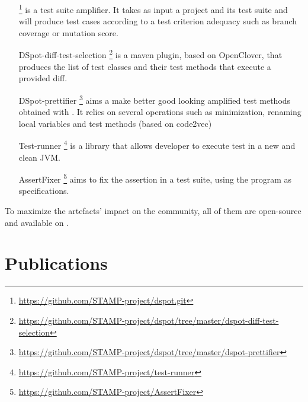\begin{itemize}
	\item[\dspot]\footnote{\url{https://github.com/STAMP-project/dspot.git}} is a test suite amplifier. 
	It takes as input a project and its test suite and will produce test cases according to a test criterion adequacy such as branch coverage or mutation score. 
	\item[DSpot-diff-test-selection]\footnote{\url{https://github.com/STAMP-project/dspot/tree/master/dspot-diff-test-selection}} is a maven plugin, based on OpenClover, that produces the list of test classes and their test methods that execute a provided diff.
	\item[DSpot-prettifier]\footnote{\url{https://github.com/STAMP-project/dspot/tree/master/dspot-prettifier}} aims a make better good looking amplified test methods obtained with \dspot. 
	It relies on several operations such as minimization, renaming local variables and test methods (based on code2vec)
	\item [Test-runner]\footnote{\url{https://github.com/STAMP-project/test-runner}} is a library that allows developer to execute test in a new and clean JVM. 
	\item[AssertFixer]\footnote{\url{https://github.com/STAMP-project/AssertFixer}} aims to fix the assertion in a test suite, using the program as specifications.
\end{itemize}

To maximize the artefacts' impact on the community, all of them are open-source and available on \gh.

\newpage

\section{Publications}
\label{sec:intro:publications}

